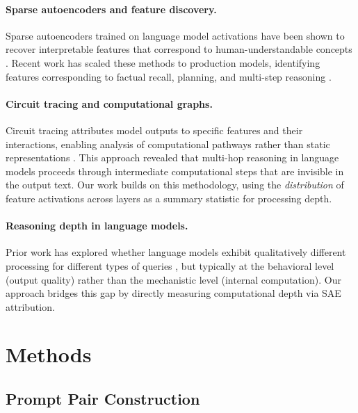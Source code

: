 \documentclass[10pt]{article}
\begin{document}
\paragraph{Sparse autoencoders and feature discovery.}
Sparse autoencoders trained on language model activations have been shown to recover interpretable features that correspond to human-understandable concepts \citep{cunningham2023sparse, bricken2023monosemanticity}. Recent work has scaled these methods to production models, identifying features corresponding to factual recall, planning, and multi-step reasoning \citep{anthropic2025biology}.

\paragraph{Circuit tracing and computational graphs.}
Circuit tracing attributes model outputs to specific features and their interactions, enabling analysis of computational pathways rather than static representations \citep{anthropic2025biology}. This approach revealed that multi-hop reasoning in language models proceeds through intermediate computational steps that are invisible in the output text. Our work builds on this methodology, using the \textit{distribution} of feature activations across layers as a summary statistic for processing depth.

\paragraph{Reasoning depth in language models.}
Prior work has explored whether language models exhibit qualitatively different processing for different types of queries \citep{wei2022chain, dziri2023faith}, but typically at the behavioral level (output quality) rather than the mechanistic level (internal computation). Our approach bridges this gap by directly measuring computational depth via SAE attribution.

\section{Methods}

\subsection{Prompt Pair Construction}
\end{document}
